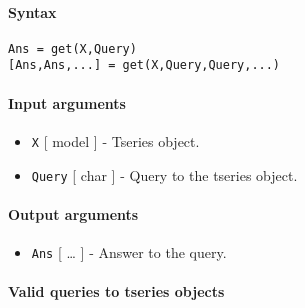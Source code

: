 


	\paragraph{Syntax}\label{syntax}

\begin{verbatim}
Ans = get(X,Query)
[Ans,Ans,...] = get(X,Query,Query,...)
\end{verbatim}

\paragraph{Input arguments}\label{input-arguments}

\begin{itemize}
\item
  \texttt{X} {[} model {]} - Tseries object.
\item
  \texttt{Query} {[} char {]} - Query to the tseries object.
\end{itemize}

\paragraph{Output arguments}\label{output-arguments}

\begin{itemize}
\itemsep1pt\parskip0pt
\item
  \texttt{Ans} {[} \ldots{} {]} - Answer to the query.
\end{itemize}

\paragraph{Valid queries to tseries
objects}\label{valid-queries-to-tseries-objects}

